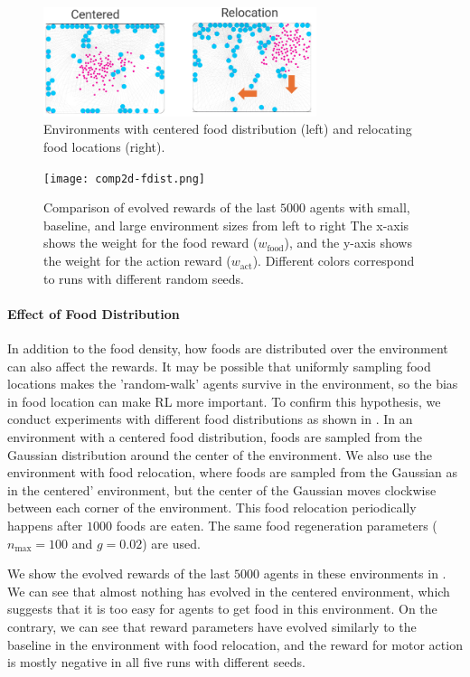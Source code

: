 \begin{figure}[t]
  \centering
  \includegraphics[width=8cm]{resources/centered-and-reloc.png}
  \caption{
    Environments with centered food distribution (left) and relocating food locations (right).
  }\label{figure:env-fdist}
\end{figure}

\begin{figure}[h]
  \centering
  \texttt{[image: comp2d-fdist.png]}
  \caption{
    Comparison of evolved rewards of the last $5000$ agents with small, baseline, and large environment sizes from left to right
    The x-axis shows the weight for the food reward ($w_{\mathrm{food}}$), and the y-axis shows the weight for the action reward ($w_{\mathrm{act}}$).
    Different colors correspond to runs with different random seeds.
  }\label{figure:result-fdist}
\end{figure}

\paragraph{Effect of Food Distribution}
In addition to the food density, how foods are distributed over the environment can also affect the rewards. It may be possible that uniformly sampling food locations makes the 'random-walk' agents survive in the environment, so the bias in food location can make RL more important. To confirm this hypothesis, we conduct experiments with different food distributions as shown in . In an environment with a centered food distribution, foods are sampled from the Gaussian distribution around the center of the environment. We also use the environment with food relocation, where foods are sampled from the Gaussian as in the centered' environment, but the center of the Gaussian moves clockwise between each corner of the environment. This food relocation periodically happens after $1000$ foods are eaten. The same food regeneration parameters ($n_{\mathrm{max}} = 100$ and $g = 0.02$) are used.

We show the evolved rewards of the last $5000$ agents in these environments in . We can see that almost nothing has evolved in the centered environment, which suggests that it is too easy for agents to get food in this environment. On the contrary, we can see that reward parameters have evolved similarly to the baseline in the environment with food relocation, and the reward for motor action is mostly negative in all five runs with different seeds.

